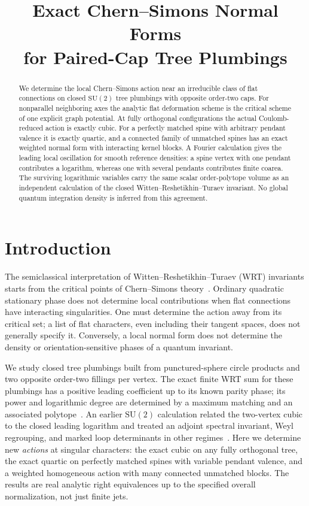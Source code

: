 \documentclass[11pt]{article}
\title{Exact Chern--Simons Normal Forms\\for Paired-Cap Tree Plumbings}
\author{}
\date{}
\theoremstyle{remark}
\newcommand{\SU}{\mathrm{SU}(2)}
\begin{document}
\maketitle
\begin{abstract}
We determine the local Chern--Simons action near an irreducible class of flat connections on closed \(\SU\) tree plumbings with opposite order-two caps. For nonparallel neighboring axes the analytic flat deformation scheme is the critical scheme of one explicit graph potential. At fully orthogonal configurations the actual Coulomb-reduced action is exactly cubic. For a perfectly matched spine with arbitrary pendant valence it is exactly quartic, and a connected family of unmatched spines has an exact weighted normal form with interacting kernel blocks. A Fourier calculation gives the leading local oscillation for smooth reference densities: a spine vertex with one pendant contributes a logarithm, whereas one with several pendants contributes finite coarea. The surviving logarithmic variables carry the same scalar order-polytope volume as an independent calculation of the closed Witten--Reshetikhin--Turaev invariant. No global quantum integration density is inferred from this agreement.
\end{abstract}

\section{Introduction}

The semiclassical interpretation of Witten--Reshetikhin--Turaev (WRT) invariants starts from the critical points of Chern--Simons theory~\cite{Witten}. Ordinary quadratic stationary phase does not determine local contributions when flat connections have interacting singularities. One must determine the action away from its critical set; a list of flat characters, even including their tangent spaces, does not generally specify it. Conversely, a local normal form does not determine the density or orientation-sensitive phases of a quantum invariant.

We study closed tree plumbings built from punctured-sphere circle products and two opposite order-two fillings per vertex. The exact finite WRT sum for these plumbings has a positive leading coefficient up to its known parity phase; its power and logarithmic degree are determined by a maximum matching and an associated polytope~\cite{Paper48}. An earlier \(\SU\) calculation related the two-vertex cubic to the closed leading logarithm and treated an adjoint spectral invariant, Weyl regrouping, and marked loop determinants in other regimes~\cite{Paper49}. Here we determine new \emph{actions} at singular characters: the exact cubic on any fully orthogonal tree, the exact quartic on perfectly matched spines with variable pendant valence, and a weighted homogeneous action with many connected unmatched blocks. The results are real analytic right equivalences up to the specified overall normalization, not just finite jets.
\end{document}

